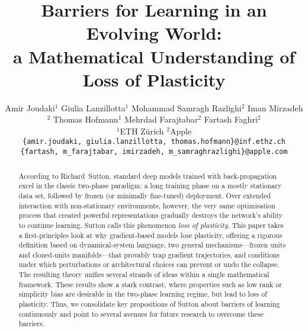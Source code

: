 \documentclass{article}
\title{Barriers for Learning in an Evolving World: \\a Mathematical Understanding of Loss of Plasticity}
\author{%
  Amir Joudaki$^{1}$ \And
  Giulia Lanzillotta$^{1}$ \And
  Mohammad Samragh Razlighi$^{2}$ \And
  Iman Mirzadeh$^{2}$ \And
  Thomas Hofmann$^{1}$ \And
  Mehrdad Farajtabar$^{2}$ \And
  Fartash Faghri$^{2}$ \And
  \vspace{-20pt}
  \\
  $^{1}$ETH Zürich
  $^{2}$Apple \\
  \texttt{\{amir.joudaki, giulia.lanzillotta, thomas.hofmann\}@inf.ethz.ch} \\
  \texttt{\{fartash, m\_farajtabar, imirzadeh, m\_samraghrazlighi\}@apple.com}
}
\begin{document}
\maketitle

\begin{abstract}
According to Richard~Sutton, standard deep models trained with back‑propagation excel in the classic two‑phase paradigm: a long training phase on a mostly stationary data set, followed by frozen (or minimally fine‑tuned) deployment.  
Over extended interaction with non‑stationary environments, however, the very same optimisation process that created powerful representations gradually destroys the network's ability to continue learning.  
Sutton calls this phenomenon \emph{loss of plasticity}.  
This paper takes a first‑principles look at why gradient‑based models lose plasticity, offering
a rigorous definition based on dynamical‑system language,  
two general mechanisms—frozen units and cloned‑units manifolds—that provably trap gradient trajectories, and  
conditions under which perturbations or architectural choices can prevent or undo the collapse.  
The resulting theory unifies several strands of ideas within a single mathematical framework. These results show a stark contrast, where properties such as low rank or simplicity bias are desirable in the two-phase learning regime, but lead to loss of plasticity. Thus, we consolidate key propositions of Sutton about barriers of learning continuously and point to several avenues for future research to overcome these barriers. 
\end{abstract}
\end{document}
